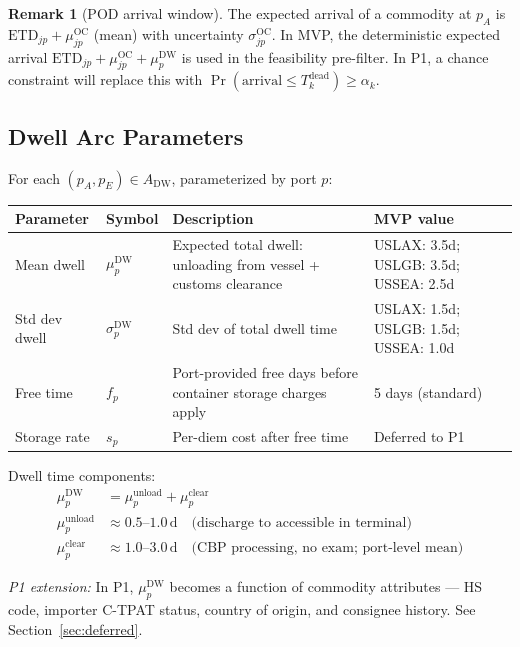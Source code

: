 \documentclass[11pt,a4paper]{article}
\theoremstyle{definition}
\newtheorem{remark}{Remark}
\begin{document}
\begin{remark}[POD arrival window]
The expected arrival of a commodity at $p_A$ is $\text{ETD}_{jp} + \mu_{jp}^{\text{OC}}$
(mean) with uncertainty $\sigma_{jp}^{\text{OC}}$. In MVP, the deterministic expected
arrival $\text{ETD}_{jp} + \mu_{jp}^{\text{OC}} + \mu_p^{\text{DW}}$ is used in the
feasibility pre-filter. In P1, a chance constraint will replace this with
$\Pr(\text{arrival} \leq T_k^{\text{dead}}) \geq \alpha_k$.
\end{remark}

\subsection{Dwell Arc Parameters}

For each $(p_A, p_E) \in A_{\text{DW}}$, parameterized by port $p$:

\begin{center}
\begin{tabular}{llp{5.5cm}l}
\toprule
Parameter & Symbol & Description & MVP value \\
\midrule
Mean dwell & $\mu_p^{\text{DW}}$ & Expected total dwell: unloading from vessel + customs clearance & USLAX: 3.5d; USLGB: 3.5d; USSEA: 2.5d \\
Std dev dwell & $\sigma_p^{\text{DW}}$ & Std dev of total dwell time & USLAX: 1.5d; USLGB: 1.5d; USSEA: 1.0d \\
Free time & $f_p$ & Port-provided free days before container storage charges apply & 5 days (standard) \\
Storage rate & $s_p$ & Per-diem cost after free time & Deferred to P1 \\
\bottomrule
\end{tabular}
\end{center}

\noindent Dwell time components:
\begin{align*}
  \mu_p^{\text{DW}} &= \mu_p^{\text{unload}} + \mu_p^{\text{clear}} \\
  \mu_p^{\text{unload}} &\approx 0.5\text{--}1.0\,\text{d} \quad \text{(discharge to accessible in terminal)} \\
  \mu_p^{\text{clear}} &\approx 1.0\text{--}3.0\,\text{d} \quad \text{(CBP processing, no exam; port-level mean)}
\end{align*}

\noindent \textit{P1 extension:} In P1, $\mu_p^{\text{DW}}$ becomes a function of commodity
attributes --- HS code, importer C-TPAT status, country of origin, and consignee history.
See Section~\ref{sec:deferred}.
\end{document}
